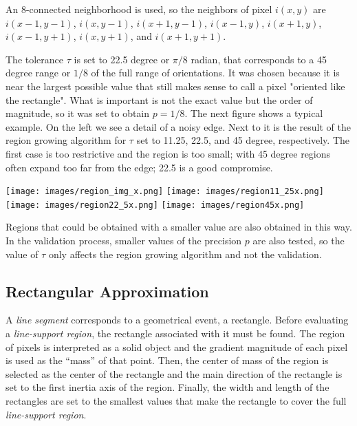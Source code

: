 \documentclass{ipol}
\begin{document}
An 8-connected neighborhood is used, so the neighbors of pixel
$i(x,y)$ are $i(x-1,y-1)$, $i(x,y-1)$, $i(x+1,y-1)$, $i(x-1,y)$,
$i(x+1,y)$, $i(x-1,y+1)$, $i(x,y+1)$, and $i(x+1,y+1)$.

The tolerance $\tau$ is set to 22.5 degree or $\pi/8$ radian, that
corresponds to a 45 degree range or $1/8$ of the full range of
orientations. It was chosen because it is near the largest possible
value that still makes sense to call a pixel "oriented like the
rectangle". What is important is not the exact value but the order of
magnitude, so it was set to obtain $p=1/8$. The next figure shows a
typical example. On the left we see a detail of a noisy edge. Next to
it is the result of the region growing algorithm for $\tau$ set to
11.25, 22.5, and 45 degree, respectively. The first case is too
restrictive and the region is too small; with 45 degree regions often
expand too far from the edge; 22.5 is a good compromise.

\begin{center}
\texttt{[image: images/region\_img\_x.png]}
\texttt{[image: images/region11\_25x.png]}
\texttt{[image: images/region22\_5x.png]}
\texttt{[image: images/region45x.png]}
\end{center}

Regions that could be obtained with a smaller value are also obtained
in this way. In the validation process, smaller values of the
precision $p$ are also tested, so the value of $\tau$ only affects the
region growing algorithm and not the validation.


\subsection{Rectangular Approximation}

A \emph{line segment} corresponds to a geometrical event, a rectangle.
Before evaluating a \emph{line-support region}, the rectangle
associated with it must be found. The region of pixels is interpreted
as a solid object and the gradient magnitude of each pixel is used as
the ``mass'' of that point. Then, the center of mass of the region is
selected as the center of the rectangle and the main direction of the
rectangle is set to the first inertia axis of the region. Finally, the
width and length of the rectangles are set to the smallest values that
make the rectangle to cover the full \emph{line-support region}.
\end{document}
